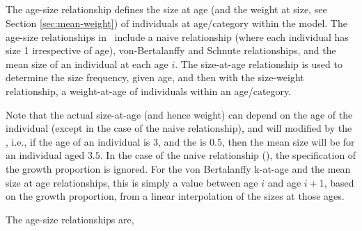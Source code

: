 \subsection{\label{sec:size-at-age}}

The age-size relationship defines the size at age (and the weight at size, see Section \ref{sec:mean-weight}) of individuals at age/category within the model. The age-size relationships in \SPM\ include a naive relationship (where each individual has size 1 irrespective of age), von-Bertalanffy and Schnute relationships, and the mean size of an individual at each age $i$. The size-at-age relationship is used to determine the size frequency, given age, and then with the size-weight relationship, a weight-at-age of individuals within an age/category. 

Note that the actual size-at-age (and hence weight) can depend on the age of the individual (except in the case of the naive relationship), and will modified by the , i.e., if the age of an individual is $3$, and the  is $0.5$, then the mean size will be for an individual aged $3.5$. In the case of the naive relationship (), the specification of the growth proportion is ignored. For the von Bertalanffy k-at-age and the mean size at age relationships, this is simply a value between age $i$ and age $i+1$, based on the growth proportion, from a linear interpolation of the sizes at those ages.

The age-size relationships are,


